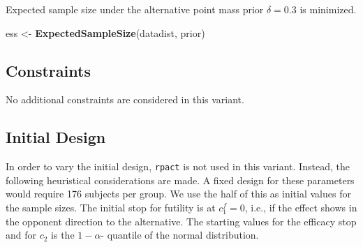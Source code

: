 \documentclass[
]{book}
\newenvironment{Shaded}{\begin{snugshade}}{\end{snugshade}}
\newcommand{\KeywordTok}[1]{\textcolor[rgb]{0.13,0.29,0.53}{\textbf{#1}}}
\newcommand{\NormalTok}[1]{#1}
\newcommand{\StringTok}[1]{\textcolor[rgb]{0.31,0.60,0.02}{#1}}
\begin{document}
Expected sample size under the alternative point mass prior \(\delta = 0.3\)
is minimized.

\begin{Shaded}
\begin{Highlighting}[]
\NormalTok{ess <-}\StringTok{ }\KeywordTok{ExpectedSampleSize}\NormalTok{(datadist, prior)}
\end{Highlighting}
\end{Shaded}

\hypertarget{constraints-10}{%
\subsection{Constraints}\label{constraints-10}}

No additional constraints are considered in this variant.

\hypertarget{initial-design-8}{%
\subsection{Initial Design}\label{initial-design-8}}

In order to vary the initial design, \texttt{rpact} is not used in this variant.
Instead, the following heuristical considerations are made.
A fixed design for these parameters would require
176
subjects per group. We use the half of this as initial values for the
sample sizes.
The initial stop for futility is at \(c_1^f=0\), i.e., if the effect shows
in the opponent direction to the alternative.
The starting values for the efficacy stop and for \(c_2\) is the \(1-\alpha\)-
quantile of the normal distribution.
\end{document}
